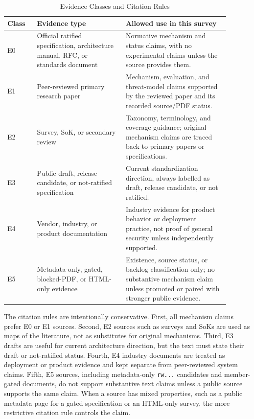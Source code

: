 \documentclass[conference]{IEEEtran}
\begin{document}
\begin{table}[htbp]
\centering
\caption{Evidence Classes and Citation Rules}
\label{tab:evidence_ranking}
\begin{tabular}{@{}p{0.12\linewidth}p{0.36\linewidth}p{0.42\linewidth}@{}}
\toprule
\textbf{Class} & \textbf{Evidence type} & \textbf{Allowed use in this survey} \\ \midrule
E0 & Official ratified specification, architecture manual, RFC, or standards document & Normative mechanism and status claims, with no experimental claims unless the source provides them. \\
E1 & Peer-reviewed primary research paper & Mechanism, evaluation, and threat-model claims supported by the reviewed paper and its recorded source/PDF status. \\
E2 & Survey, SoK, or secondary review & Taxonomy, terminology, and coverage guidance; original mechanism claims are traced back to primary papers or specifications. \\
E3 & Public draft, release candidate, or not-ratified specification & Current standardization direction, always labelled as draft, release candidate, or not ratified. \\
E4 & Vendor, industry, or product documentation & Industry evidence for product behavior or deployment practice, not proof of general security unless independently supported. \\
E5 & Metadata-only, gated, blocked-PDF, or HTML-only evidence & Existence, source status, or backlog classification only; no substantive mechanism claim unless promoted or paired with stronger public evidence. \\ \bottomrule
\end{tabular}
\end{table}

The citation rules are intentionally conservative. First, all mechanism claims
prefer E0 or E1 sources. Second, E2 sources such as surveys and SoKs are used as
maps of the literature, not as substitutes for original mechanisms. Third, E3
drafts are useful for current architecture direction, but the text must state
their draft or not-ratified status. Fourth, E4 industry documents are treated
as deployment or product evidence and kept separate from peer-reviewed system
claims. Fifth, E5 sources, including metadata-only \texttt{rw...} candidates and
member-gated documents, do not support substantive text claims unless a public
source supports the same claim. When a source has mixed properties, such as a
public metadata page for a gated specification or an HTML-only survey, the more
restrictive citation rule controls the claim.
\end{document}
